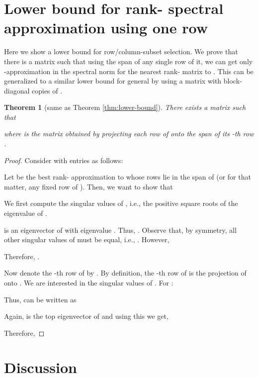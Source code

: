 \documentclass[11pt]{article}
\newtheorem{theorem}{Theorem}
\begin{document}
\section{Lower bound for rank- spectral approximation using one row}
Here we show a lower bound for row/column-subset selection. We prove that there is a matrix  such that using the span of any single row of it, we can get only -approximation in the spectral norm for the nearest rank- matrix to . This can be generalized to a similar  lower bound for general  by using a matrix with  block-diagonal copies of .

\begin{theorem}[same as Theorem \ref{thm:lower-bound}]
There exists a matrix  such that

where  is the matrix obtained by projecting each row of  onto the span of its -th row .
\end{theorem}
\begin{proof}
Consider  with entries as follows:

Let  be the best rank- approximation to  whose rows lie in the span of  (or for that matter, any fixed row of ). Then, we want to show that

We first compute the singular values of , i.e., the positive square roots of the eigenvalue of .

 is an eigenvector of  with eigenvalue . Thus, . Observe that, by symmetry, all other singular values of  must be equal, i.e., . However,

Therefore, .

Now denote the -th row of  by . By definition, the -th row of  is the projection of  onto . We are interested in the singular values of . For :

Thus,  can be written as

Again,  is the top eigenvector of  and using this we get,

Therefore,

\end{proof}

\section{Discussion}
\end{document}
